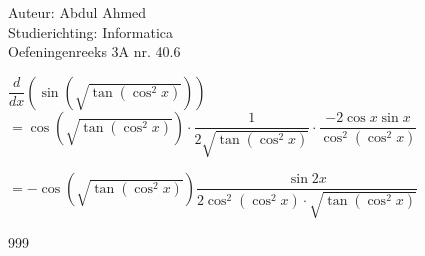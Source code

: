 \documentclass[a4paper]{article}
\begin{document}
\noindent \large Auteur: Abdul Ahmed\\
\noindent \large Studierichting: Informatica \\
\noindent \large Oefeningenreeks  3A nr. 40.6 \\

\medskip

\normalsize
$\dfrac{d}{dx}\left(\sin \left(\sqrt{\tan (\cos ^2 x)}\right)\right)$\\

$= \cos \left(\sqrt{\tan (\cos ^2 x)}\right) \cdot \dfrac{1}{2\sqrt{\tan (\cos ^2 x)}} \cdot \dfrac{-2 \cos x  \sin x}{\cos ^2 \left(\cos^2 x\right)} $

$= -\cos \left(\sqrt{\tan (\cos ^2 x)}\right)\dfrac{\sin 2x}{2 \cos ^2 \left(\cos^2 x\right)\cdot \sqrt{\tan (\cos ^2 x)} }  $\\


\begin{thebibliography}{999}
\end{thebibliography}
\end{document}
